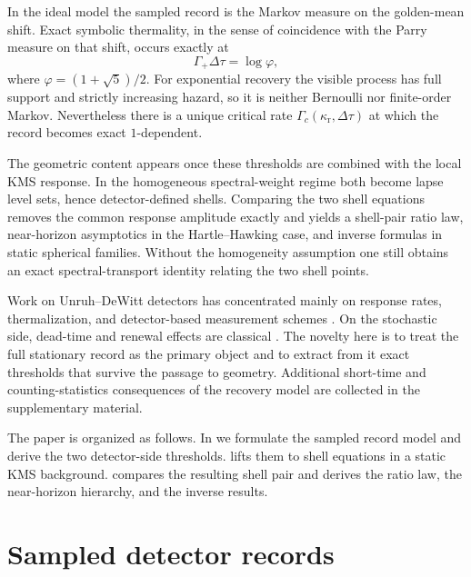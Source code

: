 \documentclass[11pt]{amsart}
\numberwithin{equation}{section}
\theoremstyle{remark}
\begin{document}
In the ideal model the sampled record is the Markov measure on the golden-mean shift. Exact symbolic thermality, in the sense of coincidence with the Parry measure on that shift, occurs exactly at
\[
\Gamma_+\Delta\tau=\log\varphi,
\]
where $\varphi=(1+\sqrt5)/2$. For exponential recovery the visible process has full support and strictly increasing hazard, so it is neither Bernoulli nor finite-order Markov. Nevertheless there is a unique critical rate $\Gamma_c(\kappa_{\mathrm r},\Delta\tau)$ at which the record becomes exact $1$-dependent.

The geometric content appears once these thresholds are combined with the local KMS response. In the homogeneous spectral-weight regime both become lapse level sets, hence detector-defined shells. Comparing the two shell equations removes the common response amplitude exactly and yields a shell-pair ratio law, near-horizon asymptotics in the Hartle--Hawking case, and inverse formulas in static spherical families. Without the homogeneity assumption one still obtains an exact spectral-transport identity relating the two shell points.

Work on Unruh--DeWitt detectors has concentrated mainly on response rates, thermalization, and detector-based measurement schemes \cite{Fewster2020,FewsterJuarezLouko2016,GarayMartinMartinezRamon2016,PoloGomezEtAl2022,TjoaEtAl2023click,PranziniEtAl2024,PranziniKeskiVakkuri2025AQFT}. On the stochastic side, dead-time and renewal effects are classical \cite{Muller1973,CantorTeich1975,Brandes2008,BrudererEtAl2014}. The novelty here is to treat the full stationary record as the primary object and to extract from it exact thresholds that survive the passage to geometry. Additional short-time and counting-statistics consequences of the recovery model are collected in the supplementary material.

The paper is organized as follows. In  we formulate the sampled record model and derive the two detector-side thresholds.  lifts them to shell equations in a static KMS background.  compares the resulting shell pair and derives the ratio law, the near-horizon hierarchy, and the inverse results.

\section{Sampled detector records}\label{sec:records}
\end{document}
